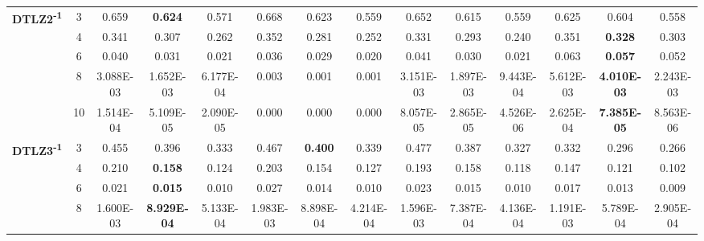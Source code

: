 \documentclass[onecolumn,10pt]{asme2ej}
\begin{document}
\begin{table}[!htb]
\begin{tabular}{|c|c|c|c|c|c|c|c|c|c|c|c|c|c|}
	\multirow{5}{*}{\textbf{DTLZ2\textsuperscript{-1}}} & 3          & 0.659         & \textbf{0.624}     & 0.571          & 0.668         & 0.623              & 0.559          & 0.652         & 0.615              & 0.559          & 0.625         & 0.604              & 0.558          \\ \cline{2-14} 
	& 4          & 0.341         & 0.307              & 0.262          & 0.352         & 0.281              & 0.252          & 0.331         & 0.293              & 0.240          & 0.351         & \textbf{0.328}     & 0.303          \\ \cline{2-14} 
	& 6          & 0.040         & 0.031              & 0.021          & 0.036         & 0.029              & 0.020          & 0.041         & 0.030              & 0.021          & 0.063         & \textbf{0.057}     & 0.052          \\ \cline{2-14} 
	& 8          & 3.088E-03     & 1.652E-03          & 6.177E-04      & 0.003         & 0.001              & 0.001          & 3.151E-03     & 1.897E-03          & 9.443E-04      & 5.612E-03     & \textbf{4.010E-03} & 2.243E-03      \\ \cline{2-14} 
	& 10         & 1.514E-04     & 5.109E-05          & 2.090E-05      & 0.000         & 0.000              & 0.000          & 8.057E-05     & 2.865E-05          & 4.526E-06      & 2.625E-04     & \textbf{7.385E-05} & 8.563E-06      \\ \hline
	\multirow{5}{*}{\textbf{DTLZ3\textsuperscript{-1}}} & 3          & 0.455         & 0.396              & 0.333          & 0.467         & \textbf{0.400}     & 0.339          & 0.477         & 0.387              & 0.327          & 0.332         & 0.296              & 0.266          \\ \cline{2-14} 
	& 4          & 0.210         & \textbf{0.158}     & 0.124          & 0.203         & 0.154              & 0.127          & 0.193         & 0.158              & 0.118          & 0.147         & 0.121              & 0.102          \\ \cline{2-14} 
	& 6          & 0.021         & \textbf{0.015}     & 0.010          & 0.027         & 0.014              & 0.010          & 0.023         & 0.015              & 0.010          & 0.017         & 0.013              & 0.009          \\ \cline{2-14} 
	& 8          & 1.600E-03     & \textbf{8.929E-04} & 5.133E-04      & 1.983E-03     & 8.898E-04          & 4.214E-04      & 1.596E-03     & 7.387E-04          & 4.136E-04      & 1.191E-03     & 5.789E-04          & 2.905E-04      \\ \cline{2-14} 

\end{tabular}
\end{table}
\end{document}
